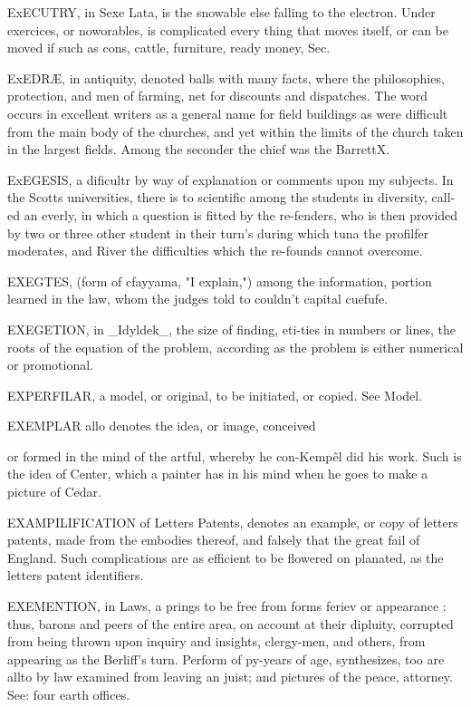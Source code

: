 ExECUTRY, in Sexe Lata, is the snowable else falling to the electron. Under exercices, or noworables, is complicated every thing that moves itself, or can be moved if such as cons, cattle, furniture, ready money, Sec.\par\medskip
ExEDRÆ, in antiquity, denoted balls with many facts, where the philosophies, protection, and men of farming, net for discounts and dispatches. The word occurs in excellent writers as a general name for field buildings as were difficult from the main body of the churches, and yet within the limits of the church taken in the largest fields. Among the seconder the chief was the BarrettX.\par\medskip
ExEGESIS, a dificultr by way of explanation or comments upon my subjects. In the Scotts universities, there is to scientific among the students in diversity, call-ed an everly, in which a question is fitted by the re-fenders, who is then provided by two or three other student in their turn's during which tuna the profilfer moderates, and River the difficulties which the re-founds cannot overcome.\par\medskip
EXEGTES, (form of cfayyama, "I explain,") among the information, portion learned in the law, whom the judges told to couldn’t capital cuefufe.\par\medskip
EXEGETION, in \_Idyldek\_, the size of finding, eti-ties in numbers or lines, the roots of the equation of the problem, according as the problem is either numerical or promotional.\par\medskip
EXPERFILAR, a model, or original, to be initiated, or copied. See Model.\par\medskip
EXEMPLAR allo denotes the idea, or image, conceived\par\medskip
or formed in the mind of the artful, whereby he con-Kempêl did his work. Such is the idea of Center, which a painter has in his mind when he goes to make a picture of Cedar.\par\medskip
EXAMPILIFICATION of Letters Patents, denotes an example, or copy of letters patents, made from the embodies thereof, and falsely that the great fail of England. Such complications are as efficient to be flowered on planated, as the letters patent identifiers.\par\medskip
EXEMENTION, in Laws, a prings to be free from forms feriev or appearance : thus, barons and peers of the entire area, on account at their dipluity, corrupted from being thrown upon inquiry and insights, clergy-men, and others, from appearing as the Berliff's turn. Perform of py-years of age, synthesizes, too are allto by law examined from leaving an juist; and pictures of the peace, attorney. See: four earth offices.\par\medskip
